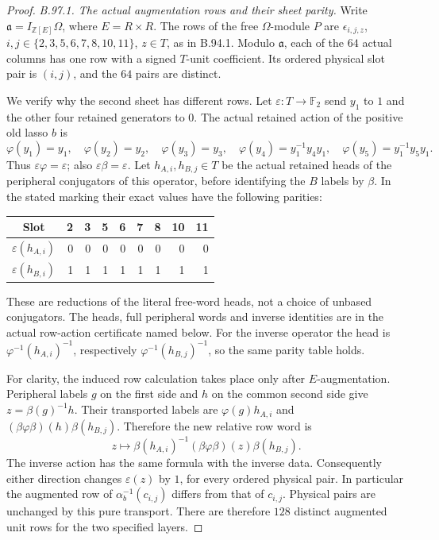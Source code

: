 \begin{proof}
\emph{B.97.1. The actual augmentation rows and their sheet parity.}
Write $\mathfrak a=I_{\mathbb Z[E]}\Omega$, where $E=R\times R$.
The rows of the free $\Omega$-module $P$ are
$\epsilon_{i,j,z}$, $i,j\in\{2,3,5,6,7,8,10,11\}$, $z\in T$,
as in B.94.1.  Modulo $\mathfrak a$, each of the $64$ actual
columns has one row with a signed $T$-unit coefficient.  Its ordered
physical slot pair is $(i,j)$, and the $64$ pairs are distinct.

We verify why the second sheet has different rows.  Let
$\varepsilon:T\to\mathbb F_2$ send $y_1$ to $1$ and the other
four retained generators to $0$.  The actual retained action of
the positive old lasso $b$ is
\[
 \varphi(y_1)=y_1,\quad \varphi(y_2)=y_2,\quad
 \varphi(y_3)=y_3,\quad
 \varphi(y_4)=y_1^{-1}y_4y_1,\quad
 \varphi(y_5)=y_1^{-1}y_5y_1.
\]
Thus $\varepsilon\varphi=\varepsilon$; also
$\varepsilon\beta=\varepsilon$.  Let $h_{A,i},h_{B,j}\in T$
be the actual retained heads of the peripheral conjugators of this
operator, before identifying the $B$ labels by $\beta$.  In the
stated marking their exact values have the following parities:
\begin{center}
\begin{tabular}{c|rrrrrrrr}
Slot&2&3&5&6&7&8&10&11\\\hline
$\varepsilon(h_{A,i})$&0&0&0&0&0&0&0&0\\
$\varepsilon(h_{B,i})$&1&1&1&1&1&1&1&1
\end{tabular}
\end{center}
These are reductions of the literal free-word heads, not a choice
of unbased conjugators.  The heads, full peripheral words and inverse
identities are in the actual row-action certificate named below.
For the inverse operator the head is
$\varphi^{-1}(h_{A,i})^{-1}$, respectively
$\varphi^{-1}(h_{B,j})^{-1}$, so the same parity table holds.

For clarity, the induced row calculation takes place only after
$E$-augmentation.  Peripheral labels $g$ on the first side and
$h$ on the common second side give $z=\beta(g)^{-1}h$.
Their transported labels are
$\varphi(g)h_{A,i}$ and
$(\beta\varphi\beta)(h)\beta(h_{B,j})$.  Therefore the new
relative row word is
\begin{equation}\label{eq:B97-row-action}
 z\longmapsto
 \beta(h_{A,i})^{-1}(\beta\varphi\beta)(z)\beta(h_{B,j}).
\end{equation}
The inverse action has the same formula with the inverse data.
Consequently either direction changes $\varepsilon(z)$ by $1$,
for every ordered physical pair.  In particular the augmented
row of $\alpha_b^{-1}(c_{i,j})$ differs from that of $c_{i,j}$.
Physical pairs are unchanged by this pure transport.  There are
therefore $128$ distinct augmented unit rows for the two specified
layers.


\end{proof}

